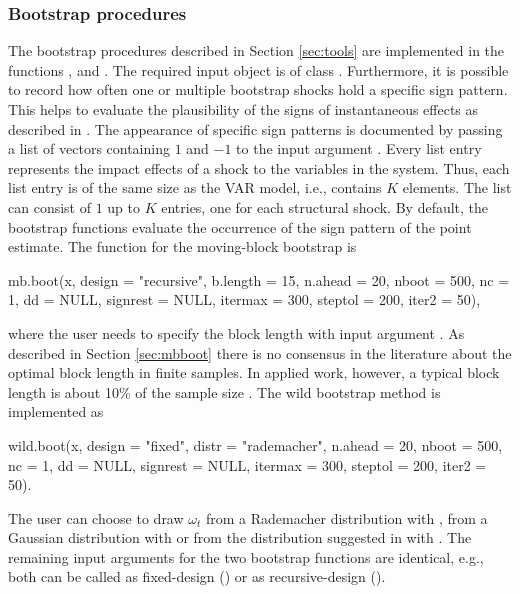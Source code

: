 \documentclass[nojss]{jss}\usepackage[]{graphicx}\usepackage[]{color}
\begin{document}
\subsubsection{Bootstrap procedures}
The bootstrap procedures described in Section \ref{sec:tools} are implemented in the functions ,  and . The required input object  is of class . Furthermore, it is possible to record how often one or multiple bootstrap shocks hold a specific sign pattern. This helps to evaluate the plausibility of the signs of instantaneous effects as described in \cite{HerwartzLDI2018}. The appearance of specific sign patterns is documented by passing a list of vectors containing $1$ and $-1$ to the input argument . Every list entry represents the impact effects of a shock to the variables in the system. Thus, each list entry is of the same size as the VAR model, i.e., contains $K$ elements. The list can consist of $1$ up to $K$ entries, one for each structural shock. By default, the bootstrap functions evaluate the occurrence of the sign pattern of the point estimate. The  function for the moving-block bootstrap is
\begin{CodeChunk}
\begin{CodeInput}
mb.boot(x, design = "recursive", b.length = 15, n.ahead = 20,
  nboot = 500, nc = 1, dd = NULL, signrest = NULL, itermax = 300,
  steptol = 200, iter2 = 50),
\end{CodeInput}
\end{CodeChunk}
where the user needs to specify the block length with input argument . As described in Section \ref{sec:mbboot} there is no consensus in the literature about the optimal block length in finite samples. In applied work, however, a typical block length is about 10\% of the sample size  \citep[see, e.g.,][]{BJT2016, LS2019}. The wild bootstrap method is implemented as
\begin{CodeChunk}
\begin{CodeInput}
wild.boot(x, design = "fixed", distr = "rademacher", n.ahead = 20,
  nboot = 500, nc = 1, dd = NULL, signrest = NULL, itermax = 300,
  steptol = 200, iter2 = 50).
\end{CodeInput}
\end{CodeChunk}
The user can choose to draw $\omega_t$ from a Rademacher distribution with , from a Gaussian  distribution with  or from the distribution suggested in \cite{Mammen1993} with . The remaining input arguments for the two bootstrap functions are identical, e.g., both can be called as fixed-design () or as recursive-design ().
\end{document}
